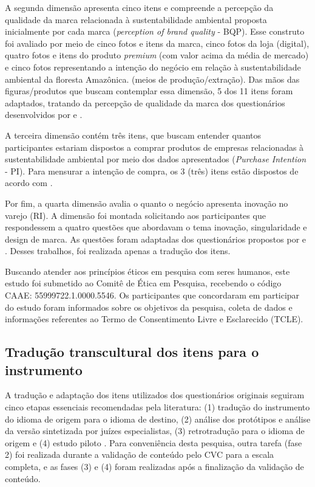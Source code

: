 A segunda dimensão apresenta cinco itens e compreende a percepção da qualidade da marca relacionada à sustentabilidade ambiental proposta inicialmente por cada marca (\textit{perception of brand quality} - BQP). Esse construto foi avaliado por meio de cinco fotos e itens da marca, cinco fotos da loja (digital), quatro fotos e itens do produto \textit{premium} (com valor acima da média de mercado) e cinco fotos representando a intenção do negócio em relação à sustentabilidade ambiental da floresta Amazônica. (meios de produção/extração). Das mãos das figuras/produtos que buscam contemplar essa dimensão, 5 dos 11 itens foram adaptados, tratando da percepção de qualidade da marca dos questionários desenvolvidos por  e .

A terceira dimensão contém três itens, que buscam entender quantos participantes estariam dispostos a comprar produtos de empresas relacionadas à sustentabilidade ambiental por meio dos dados apresentados (\textit{Purchase Intention} - PI). Para mensurar a intenção de compra, os 3 (três) itens estão dispostos de acordo com .

Por fim, a quarta dimensão avalia o quanto o negócio apresenta inovação no varejo (RI). A dimensão foi montada solicitando aos participantes que respondessem a quatro questões que abordavam o tema inovação, singularidade e design de marca. As questões foram adaptadas dos questionários propostos por  e . Desses trabalhos, foi realizada apenas a tradução dos itens.

Buscando atender aos princípios éticos em pesquisa com seres humanos, este estudo foi submetido ao Comitê de Ética em Pesquisa, recebendo o código CAAE: 55999722.1.0000.5546. Os participantes que concordaram em participar do estudo foram informados sobre os objetivos da pesquisa, coleta de dados e informações referentes ao Termo de Consentimento Livre e Esclarecido (TCLE).

\subsection{Tradução transcultural dos itens para o instrumento}

A tradução e adaptação dos itens utilizados dos questionários originais seguiram cinco etapas essenciais recomendadas pela literatura: (1) tradução do instrumento do idioma de origem para o idioma de destino, (2) análise dos protótipos e análise da versão sintetizada por juízes especialistas, (3) retrotradução para o idioma de origem e (4) estudo piloto \cite{Hambleton1993TranslatingStudies,Gjersing2010Cross-culturalConsiderations}. Para conveniência desta pesquisa, outra tarefa (fase 2) foi realizada durante a validação de conteúdo pelo CVC para a escala completa, e as fases (3) e (4) foram realizadas após a finalização da validação de conteúdo.

